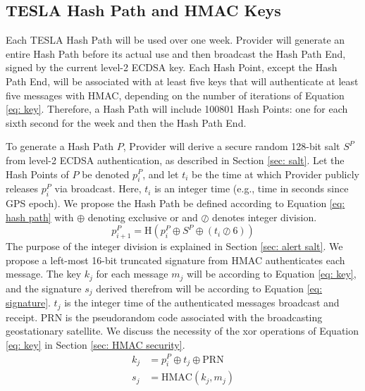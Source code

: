 \documentclass[letterpaper,times]{IONconf/IONconf}
\begin{document}
\subsection{TESLA Hash Path and HMAC Keys} \label{sec: TESLA Hash Path and HMAC Keys}

Each TESLA Hash Path will be used over one week.
Provider will generate an entire Hash Path before its actual use and then broadcast the Hash Path End, signed by the current level-2 ECDSA key.
Each Hash Point, except the Hash Path End, will be associated with at least five keys that will authenticate at least five messages with HMAC, depending on the number of iterations of Equation \ref{eq: key}.
Therefore, a Hash Path will include 100801 Hash Points: one for each sixth second for the week and then the Hash Path End.

To generate a Hash Path $P$, Provider will derive a secure random 128-bit salt $S^P$ from level-2 ECDSA authentication, as described in Section \ref{sec: salt}.
Let the Hash Points of $P$ be denoted $p^P_i$, and let $t_i$ be the time at which Provider publicly releases $p^P_i$ via broadcast.
Here, $t_i$ is an integer time (e.g., time in seconds since GPS epoch).
We propose the Hash Path be defined according to Equation \eqref{eq: hash path} with $\oplus$ denoting exclusive or and $\oslash$ denotes integer division.
\begin{equation}\label{eq: hash path}
p^P_{i+1} = \textrm{H} \left(p^P_i \oplus S^P \oplus (t_i \oslash 6) \right)
\end{equation}
The purpose of the integer division is explained in Section \ref{sec: alert salt}.
We propose a left-most 16-bit truncated signature from HMAC authenticates each message.
The key $k_j$ for each message $m_j$ will be according to Equation \ref{eq: key}, and the signature $s_j$ derived therefrom will be according to Equation \eqref{eq: signature}.
$t_j$ is the integer time of the authenticated messages broadcast and receipt.
PRN is the pseudorandom code associated with the broadcasting geostationary satellite.
We discuss the necessity of the xor operations of Equation \eqref{eq: key} in Section \ref{sec: HMAC security}.
\begin{align} 
k_j &= p^P_i \oplus t_j \oplus \textrm{PRN} \label{eq: key} \\
s_j &= \textrm{HMAC}(k_j, m_j) \label{eq: signature}
\end{align}
\end{document}
